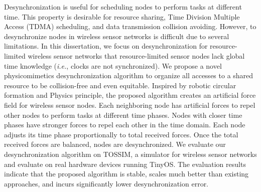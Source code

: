 \begin{englishabstract}
Desynchronization is useful for scheduling nodes to perform tasks at different time. This property is desirable for resource sharing, Time Division Multiple Access (TDMA) scheduling, and data transmission collision avoiding.
However, to desynchronize nodes in wireless sensor networks is difficult due to several limitations.
In this dissertation, we focus on desynchronization for resource-limited wireless sensor networks that resource-limited sensor nodes lack global time knowledge (\textit{i.e.}, clocks are not synchronized).
We propose a novel physicomimetics desynchronization algorithm to organize all accesses to a shared resource to be collision-free and even equitable.
Inspired by robotic circular formation and Physics principle, the proposed algorithm creates an artificial force field for wireless sensor nodes. 
Each neighboring node has artificial forces to repel other nodes to perform tasks at different time phases. Nodes with closer time phases have stronger forces to repel each other in the time domain. Each node adjusts its time phase proportionally to total received forces. Once the total received forces are balanced, nodes are desynchronized. 
We evaluate our desynchronization algorithm on TOSSIM, a simulator for wireless sensor networks and evaluate on real hardware devices running TinyOS. The evaluation results indicate that the proposed algorithm is stable, scales much better than existing approaches, and incurs significantly lower desynchronization error.
\end{englishabstract}
